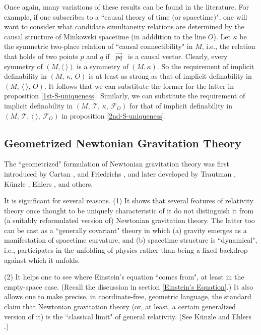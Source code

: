 \documentclass [12] {article}
\theoremstyle{plain}
\numberwithin{figure}{subsection}
\numberwithin{proposition}{subsection}
\begin{document}
Once again, many variations of these results can be found in the literature.   %
For example, if one subscribes to a ``causal theory of time (or spacetime)", one will want to consider what candidate simultaneity relations are determined by the causal structure of Minkowski spacetime (in adddition to the line $O$).   Let $\kappa$ be the symmetric two-place relation of ``causal connectibility" in $M$, i.e., the relation that holds of two points $p$ and $q$ if \,  $\overrightarrow{pq}$ \,  is a causal vector.  Clearly, every symmetry of $(M, \langle  \ \rangle)$ is a symmetry of  $(M, \kappa)$. So the requirement of implicit definability in $(M, \,   \kappa, \,  O)$ is at least as strong as that of implicit definability in  $(M, \,   \langle  \ \rangle, \,  O)$.  It follows that we can substitute the former for the latter in proposition \ref{1st-S-uniqueness}. Similarly, we can substitute the requirement of implicit definability in $(M, \, \mathcal{T},  \,   \kappa,  \,  \mathcal{F}_O)$ for that of implicit definability in $(M, \, \mathcal{T},  \,   \langle  \ \rangle,  \,  \mathcal{F}_O)$ in proposition \ref{2nd-S-uniqueness}. 



\subsection{Geometrized Newtonian Gravitation Theory}\label{Geometrized}

The ``geometrized" formulation  of Newtonian gravitation theory was first introduced by Cartan ,  and Friedrichs , and later developed by Trautman  ,   K\"unzle , 
Ehlers , and others. 

It is significant for several reasons. (1)  It shows that several features of relativity theory once thought to be uniquely characteristic of it  do not distinguish it from (a suitably reformulated version of) Newtonian gravitation theory. The latter too can be cast as a ``generally covariant" theory in which  (a) gravity emerges as a manifestation of spacetime curvature, and (b) spacetime structure is ``dynamical",  i.e., participates in the unfolding of physics rather than being a fixed backdrop against which it unfolds.  

(2) It helps one to  see where Einstein's equation ``comes from", at least in the empty-space case. (Recall the discussion in section \ref{Einstein's Equation}.) It also allows one to make precise, in coordinate-free, geometric language,   the  standard claim that Newtonian gravitation theory (or, at least, a certain generalized version of it) is the ``classical limit" of general relativity.  (See  K\"unzle  and Ehlers .)  
\end{document}
